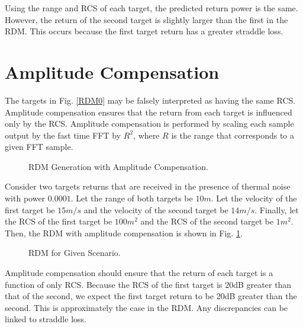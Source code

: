 \documentclass[conference]{IEEEtran}
\begin{document}
Using the range and RCS of each target, the predicted return power is the same. However, the return of the second target is slightly larger than the first in the RDM. This occurs because the first target return has a greater straddle loss.
\section{Amplitude Compensation}
The targets in Fig. \ref{RDM0} may be falsely interpreted as having the same RCS. Amplitude compensation ensures that the return from each target is influenced only by the RCS. Amplitude compensation is performed by scaling each sample output by the fast time FFT by $R^2$, where $R$ is the range that corresponds to a given FFT sample. 
\begin{figure}[H]
\centerline{}
\caption{RDM Generation with Amplitude Compensation.}
\end{figure}
Consider two targets returns that are received in the presence of thermal noise with power $0.0001$. Let the range of both targets be $10m$. Let the velocity of the first target be $15m/s$ and the velocity of the second target be $14m/s$. Finally, let the RCS of the first target be $100m^2$ and the RCS of the second target be $1m^2$. Then, the RDM with amplitude compensation is shown in Fig. \ref{RDM1}.
\begin{figure}[H]
\centerline{}
\caption{RDM for Given Scenario.}
\label{RDM1}
\end{figure}
Amplitude compensation should ensure that the return of each target is a function of only RCS. Because the RCS of the first target is 20dB greater than that of the second, we expect the first target return to be 20dB greater than the second. This is approximately the case in the RDM. Any discrepancies can be linked to straddle loss.
\end{document}
